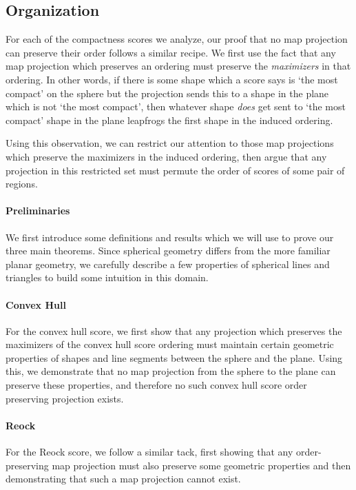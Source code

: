 \subsection{Organization}


For each of the compactness scores we analyze, our proof that no map
projection can preserve their order follows a similar recipe. We
first use the fact that any map projection which preserves an ordering
must preserve the \textit{maximizers} in that ordering.  In other words,
if there is some shape which a score says is `the most compact' on the sphere 
but the projection sends this to a shape in the plane which is not `the most compact', then whatever 
shape \textit{does} get sent to `the most compact' shape in the plane leapfrogs 
the first shape in the induced ordering.

Using this observation, we can restrict our attention to those map
projections which preserve the maximizers in the induced ordering,
then argue that any projection in this restricted set must permute the
order of scores of some pair of regions.


\paragraph{Preliminaries}
We first introduce some definitions and results which we will use to prove our 
three main theorems.  Since spherical geometry differs from the more familiar planar geometry, 
we carefully describe a few properties of spherical lines and triangles to build some intuition 
in this domain. 


\paragraph{Convex Hull}
For the convex hull score, we first 
show that any projection which preserves the maximizers of the convex hull score 
ordering must maintain certain geometric properties of shapes and line segments 
between the sphere and the plane.  Using this, we demonstrate that no 
map projection from the sphere to the plane can preserve these properties, and therefore 
no such convex hull score order preserving projection exists.



\paragraph{Reock}
For the Reock score, we follow a similar tack, first showing that any 
order-preserving map projection must also preserve some geometric properties 
and then demonstrating that such a map projection cannot exist.





